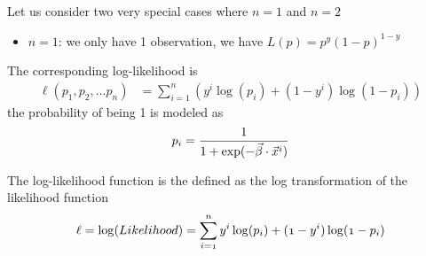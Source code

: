 \documentclass[12pt, oneside]{article}
\begin{document}
Let us consider two very special cases where $n=1$ and $n=2$
\begin{itemize}
\item $n=1$: we only have 1 observation, we have $L(p)=p^{y}(1-p)^{1-y}$
\end{itemize}


The corresponding log-likelihood is 
\begin{align*}
\ell(p_1, p_2,...p_n)&=\sum\limits_{i=1}^{n}\left(y^i \log(p_i)+(1-y^i)\log(1-p_i)\right)
\end{align*}
the probability of being 1 is modeled as 
$$\mathnormal{p_i}=\frac{1}{1+\mathnormal{\exp(-\vec{\beta}\cdot\vec{x}^i)}}$$




The log-likelihood function is the defined as the log transformation of the likelihood function
\begin{align*}
\mathnormal{\ell}=\mathnormal{\log(Likelihood)}
&=\mathnormal{\sum_{i=1}^{n}y^i\log(p_i)+(1-y^i)\log(1-p_i)}\\
\end{align*}
\end{document}
